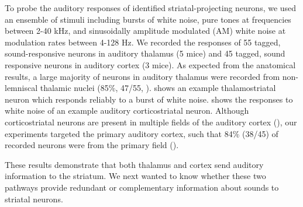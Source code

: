 To probe the auditory responses of identified striatal-projecting neurons, we used an ensemble of stimuli including bursts of white noise, pure tones at frequencies between 2-40 kHz, and sinusoidally amplitude modulated (AM) white noise at modulation rates between 4-128 Hz. 
%
We recorded the responses of 55 tagged, sound-responsive neurons in auditory thalamus (5 mice) and 45 tagged, sound responsive neurons in auditory cortex (3 mice). 
%
As expected from the anatomical results, a large majority of neurons in auditory thalamus were recorded from non-lemniscal thalamic nuclei (85\%, 47/55, \fig{\NoiseLaserThalLocations}).
%
\fig{\NoiseLaserThalExample} shows an example thalamostriatal neuron which responds reliably to a burst of white noise.
%
\fig{\NoiseLaserACExample} shows the responses to white noise of an example auditory corticostriatal neuron.
%
Although corticostriatal neurons are present in multiple fields of the auditory cortex (\fig{\AnatomyACExample}), our experiments targeted the primary auditory cortex, such that 84\% (38/45) of recorded neurons were from the primary field (\fig{\NoiseLaserACLocations}).

These results demonstrate that both thalamus and cortex send auditory information to the striatum. We next wanted to know whether these two pathways provide redundant or complementary information about sounds to striatal neurons.

